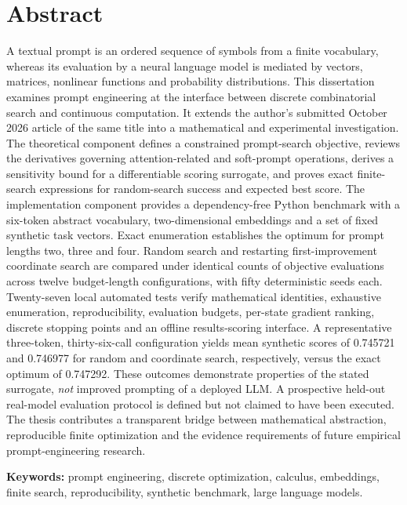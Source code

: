 \documentclass[12pt,a4paper,oneside]{report}
\begin{document}
\chapter*{Abstract}
A textual prompt is an ordered sequence of symbols from a finite vocabulary, whereas its evaluation by a neural language model is mediated by vectors, matrices, nonlinear functions and probability distributions. This dissertation examines prompt engineering at the interface between discrete combinatorial search and continuous computation. It extends the author's submitted October 2026 article of the same title into a mathematical and experimental investigation. The theoretical component defines a constrained prompt-search objective, reviews the derivatives governing attention-related and soft-prompt operations, derives a sensitivity bound for a differentiable scoring surrogate, and proves exact finite-search expressions for random-search success and expected best score. The implementation component provides a dependency-free Python benchmark with a six-token abstract vocabulary, two-dimensional embeddings and a set of fixed synthetic task vectors. Exact enumeration establishes the optimum for prompt lengths two, three and four. Random search and restarting first-improvement coordinate search are compared under identical counts of objective evaluations across twelve budget-length configurations, with fifty deterministic seeds each. Twenty-seven local automated tests verify mathematical identities, exhaustive enumeration, reproducibility, evaluation budgets, per-state gradient ranking, discrete stopping points and an offline results-scoring interface. A representative three-token, thirty-six-call configuration yields mean synthetic scores of 0.745721 and 0.746977 for random and coordinate search, respectively, versus the exact optimum of 0.747292. These outcomes demonstrate properties of the stated surrogate, \emph{not} improved prompting of a deployed LLM. A prospective held-out real-model evaluation protocol is defined but not claimed to have been executed. The thesis contributes a transparent bridge between mathematical abstraction, reproducible finite optimization and the evidence requirements of future empirical prompt-engineering research.

\noindent\textbf{Keywords:} prompt engineering, discrete optimization, calculus, embeddings, finite search, reproducibility, synthetic benchmark, large language models.
\clearpage
\end{document}
